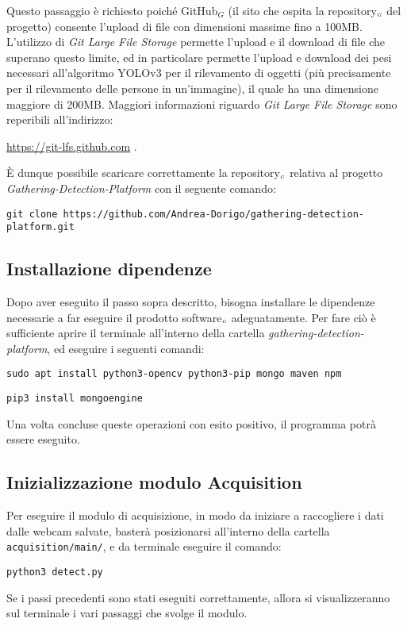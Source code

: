 Questo passaggio è richiesto poiché GitHub$_G$ (il sito che ospita la repository$_{\scaleto{G}{3pt}}$ del progetto) consente l'upload di file con dimensioni massime fino a 100MB.
L'utilizzo di \textit{Git Large File Storage} permette l'upload e il download di file che superano questo limite, ed in particolare permette l'upload e download dei pesi necessari all'algoritmo YOLOv3 per il rilevamento di oggetti (più precisamente per il rilevamento delle persone in un'immagine), il quale ha una dimensione maggiore di 200MB. Maggiori informazioni riguardo \textit{Git Large File Storage} sono reperibili all'indirizzo:
\begin{center}
 \url{https://git-lfs.github.com} .
\end{center}

È dunque possibile scaricare correttamente la repository$_{\scaleto{G}{3pt}}$ relativa al progetto \textit{Gathering-Detection-Platform} con il seguente comando:
\begin{lstlisting}
git clone https://github.com/Andrea-Dorigo/gathering-detection-platform.git
\end{lstlisting}

\subsection{Installazione dipendenze}\label{RequisitiDiSistemaEdInstallazioneInstallazioneInstallazioneDipendenze}
Dopo aver eseguito il passo sopra descritto, bisogna installare le dipendenze necessarie a far eseguire il prodotto software$_{\scaleto{G}{3pt}}$ adeguatamente.
Per fare ciò è sufficiente aprire il terminale all'interno della cartella \textit{gathering-detection-platform}, ed eseguire i seguenti comandi:
\begin{lstlisting}
sudo apt install python3-opencv python3-pip mongo maven npm
\end{lstlisting}
\begin{lstlisting}
pip3 install mongoengine
\end{lstlisting}

Una volta concluse queste operazioni con esito positivo, il programma potrà essere eseguito.

\subsection{Inizializzazione modulo Acquisition}\label{RequisitiDiSistemaEdInstallazioneInstallazioneInizializzazioneModuloAcquisition}
Per eseguire il modulo di acquisizione, in modo da iniziare a raccogliere i dati dalle webcam salvate, basterà posizionarsi all'interno della cartella \texttt{acquisition/main/}, e da terminale eseguire il comando:
\begin{lstlisting}
python3 detect.py
\end{lstlisting}
Se i passi precedenti sono stati eseguiti correttamente, allora si visualizzeranno sul terminale i vari passaggi che svolge il modulo.


